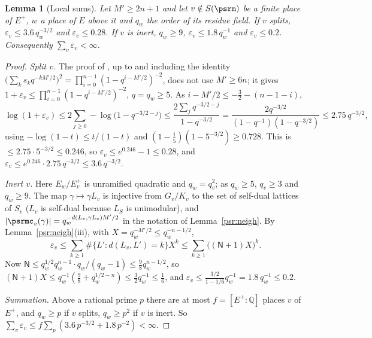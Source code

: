 \documentclass[10pt]{amsart}
\newtheorem{lemma}[theorem]{Lemma}
\theoremstyle{definition}
\theoremstyle{remark}
\newcommand{\Q}{\mathbb Q}
\begin{document}
\begin{lemma}[Local sums]\label{psr:local}
Let $M'\ge2n+1$ and let $v\notin S(\psrm)$ be a finite place of $E^+$, $w$ a place of $E$ above it and
$q_w$ the order of its residue field. If $v$ splits, $\varepsilon_v\le3.6\,q_w^{-3/2}$ and
$\varepsilon_v\le0.28$. If $v$ is inert, $q_w\ge9$, $\varepsilon_v\le1.8\,q_w^{-1}$ and $\varepsilon_v\le
0.2$. Consequently $\sum_v\varepsilon_v<\infty$.
\end{lemma}
\begin{proof}
\emph{Split $v$.} The proof of {\cite[Lemma~2.11(b)]{P53}}, up to and including the identity
$\bigl(\sum_ks_kq^{-kM'/2}\bigr)^2=\prod_{i=0}^{n-1}(1-q^{i-M'/2})^{-2}$, does not use $M'\ge6n$; it gives
$1+\varepsilon_v\le\prod_{i=0}^{n-1}(1-q^{i-M'/2})^{-2}$, $q=q_w\ge5$. As $i-M'/2\le-\frac32-(n-1-i)$,
\[
\log(1+\varepsilon_v)\le2\sum_{j\ge0}-\log\bigl(1-q^{-3/2-j}\bigr)\le\frac{2\sum_jq^{-3/2-j}}{1-q^{-3/2}}
=\frac{2q^{-3/2}}{(1-q^{-1})(1-q^{-3/2})}\le2.75\,q^{-3/2},
\]
using $-\log(1-t)\le t/(1-t)$ and $(1-\frac15)(1-5^{-3/2})\ge0.728$. This is $\le2.75\cdot5^{-3/2}\le
0.246$, so $\varepsilon_v\le e^{0.246}-1\le0.28$, and $\varepsilon_v\le e^{0.246}\cdot2.75\,q^{-3/2}\le
3.6\,q^{-3/2}$.

\emph{Inert $v$.} Here $E_w/E^+_v$ is unramified quadratic and $q_w=q_v^2$; as $q_w\ge5$, $q_v\ge3$ and
$q_w\ge9$. The map $\gamma\mapsto\gamma L_v$ is injective from $G_v/K_v$ to the set of self-dual
lattices of $S_v$ ($L_v$ is self-dual because $L_S$ is unimodular), and $|\psrmc_v(\gamma)|=
q_w^{-d(L_v,\gamma L_v)M'/2}$ in the notation of Lemma~\ref{psr:neigh}. By Lemma~\ref{psr:neigh}(iii),
with $X=q_w^{-M'/2}\le q_w^{-n-1/2}$,
\[
\varepsilon_v\le\sum_{k\ge1}\#\{L':d(L_v,L')=k\}X^k\le\sum_{k\ge1}\bigl((\mathsf N+1)X\bigr)^k .
\]
Now $\mathsf N\le q_w^{1/2}q_w^{n-1}\cdot q_w/(q_w-1)\le\frac98q_w^{n-1/2}$, so $(\mathsf N+1)X\le
q_w^{-1}(\frac98+q_w^{1/2-n})\le\frac32q_w^{-1}\le\frac16$, and $\varepsilon_v\le\frac{3/2}{1-1/6}q_w^{-1}
=1.8\,q_w^{-1}\le0.2$.

\emph{Summation.} Above a rational prime $p$ there are at most $f=[E^+:\Q]$ places $v$ of $E^+$, and
$q_w\ge p$ if $v$ splits, $q_w\ge p^2$ if $v$ is inert. So $\sum_v\varepsilon_v\le f\sum_p(3.6\,
p^{-3/2}+1.8\,p^{-2})<\infty$.
\end{proof}
\end{document}
